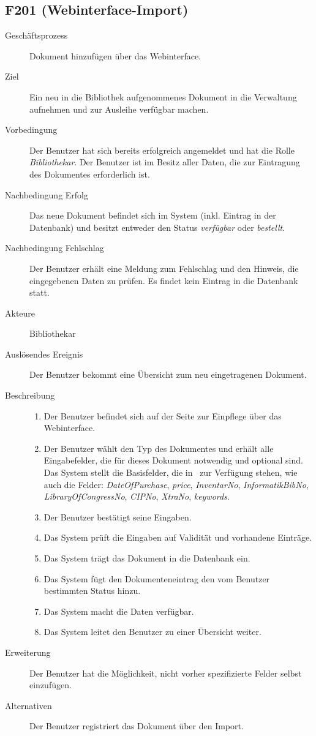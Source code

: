 \subsection{F201 (Webinterface-Import)}
\label{F:Web-Import}
\begin{description}
  \item[Geschäftsprozess]Dokument hinzufügen über das Webinterface.
  \item[Ziel]Ein neu in die Bibliothek aufgenommenes Dokument in die Verwaltung aufnehmen und zur Ausleihe verfügbar machen.
  \item[Vorbedingung]Der Benutzer hat sich bereits erfolgreich angemeldet und hat die Rolle \emph{Bibliothekar}. Der Benutzer ist im Besitz aller Daten, die zur Eintragung des Dokumentes erforderlich ist.
  \item[Nachbedingung Erfolg]Das neue Dokument befindet sich im System (inkl. Eintrag in der Datenbank) und besitzt entweder den Status \emph{verfügbar} oder \emph{bestellt}.
  \item[Nachbedingung Fehlschlag]Der Benutzer erhält eine Meldung zum Fehlschlag und den Hinweis, die eingegebenen Daten zu prüfen. Es findet kein Eintrag in die Datenbank statt.
  \item[Akteure]Bibliothekar
  \item[Auslösendes Ereignis]Der Benutzer bekommt eine Übersicht zum neu eingetragenen Dokument.
  \item[Beschreibung]\hfill
    \begin{enumerate}
      \item Der Benutzer befindet sich auf der Seite zur Einpflege über das Webinterface.
      \item Der Benutzer wählt den Typ des Dokumentes und erhält alle Eingabefelder, die für dieses Dokument notwendig und optional sind. Das System stellt die Basisfelder, die in \BibTeX\ zur Verfügung stehen, wie auch die Felder: \emph{DateOfPurchase}, \emph{price}, \emph{InventarNo}, \emph{InformatikBibNo}, \emph{LibraryOfCongressNo}, \emph{CIPNo}, \emph{XtraNo}, \emph{keywords}.
      \item Der Benutzer bestätigt seine Eingaben.
      \item Das System prüft die Eingaben auf Validität und vorhandene Einträge.
      \item Das System trägt das Dokument in die Datenbank ein.
      \item Das System fügt den Dokumenteneintrag den vom Benutzer bestimmten Status hinzu.
      \item Das System macht die Daten verfügbar.
      \item Das System leitet den Benutzer zu einer Übersicht weiter.
    \end{enumerate}
  \item[Erweiterung]Der Benutzer hat die Möglichkeit, nicht vorher spezifizierte Felder selbst einzufügen.
  \item[Alternativen]Der Benutzer registriert das Dokument über den \BibTeX Import.
\end{description}

